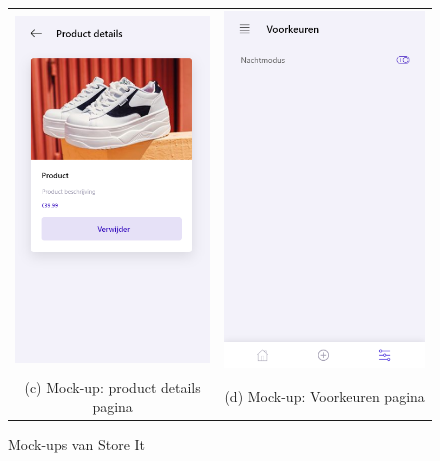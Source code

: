 \begin{figure}
\begin{tabular}{cc}
        \includegraphics[width=65mm]{img/methodologie/mock-details_screen.png} &   \includegraphics[width=65mm]{img/methodologie/mock-preferences.png} \\
        (c) Mock-up: product details pagina & (d) Mock-up: Voorkeuren pagina \\[6pt]
    \end{tabular}
    \label{fig:mock-ups-store-it}
    \caption{Mock-ups van Store It}
\end{figure}

